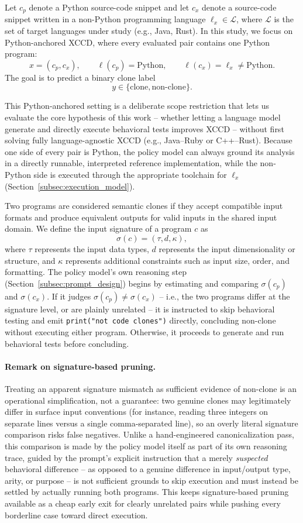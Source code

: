 Let $c_p$ denote a Python source-code snippet and let $c_x$ denote a
source-code snippet written in a non-Python programming language
$\ell_x \in \mathcal{L}$, where $\mathcal{L}$ is the set of target languages
under study (e.g., Java, Rust). In this study, we focus on Python-anchored
XCCD, where every evaluated pair contains one Python program:
\[
    x = (c_p, c_x),
    \qquad
    \ell(c_p)=\text{Python},
    \qquad
    \ell(c_x)=\ell_x \neq \text{Python}.
\]
The goal is to predict a binary clone label
\[
    y \in \{\text{clone}, \text{non-clone}\}.
\]

This Python-anchored setting is a deliberate scope restriction that lets us
evaluate the core hypothesis of this work -- whether letting a language model
generate and directly execute behavioral tests improves XCCD -- without first
solving fully language-agnostic XCCD (e.g., Java--Ruby or C++--Rust). Because
one side of every pair is Python, the policy model can always ground its
analysis in a directly runnable, interpreted reference implementation, while
the non-Python side is executed through the appropriate toolchain for
$\ell_x$ (Section~\ref{subsec:execution_model}).

Two programs are considered semantic clones if they accept compatible input
formats and produce equivalent outputs for valid inputs in the shared input
domain. We define the input signature of a program $c$ as
\[
    \sigma(c) = (\tau, d, \kappa),
\]
where $\tau$ represents the input data types, $d$ represents the input
dimensionality or structure, and $\kappa$ represents additional constraints
such as input size, order, and formatting. The policy model's own reasoning
step (Section~\ref{subsec:prompt_design}) begins by estimating and comparing
$\sigma(c_p)$ and $\sigma(c_x)$. If it judges
$\sigma(c_p) \neq \sigma(c_x)$ -- i.e., the two programs differ at the
signature level, or are plainly unrelated -- it is instructed to skip
behavioral testing and emit \texttt{print("not code clones")} directly,
concluding non-clone without executing either program. Otherwise, it proceeds
to generate and run behavioral tests before concluding.

\paragraph{Remark on signature-based pruning.}
Treating an apparent signature mismatch as sufficient evidence of non-clone is
an operational simplification, not a guarantee: two genuine clones may
legitimately differ in surface input conventions (for instance, reading three
integers on separate lines versus a single comma-separated line), so an overly
literal signature comparison risks false negatives. Unlike a hand-engineered
canonicalization pass, this comparison is made by the policy model itself as
part of its own reasoning trace, guided by the prompt's explicit instruction
that a merely \emph{suspected} behavioral difference -- as opposed to a
genuine difference in input/output type, arity, or purpose -- is not
sufficient grounds to skip execution and must instead be settled by actually
running both programs. This keeps signature-based pruning available as a
cheap early exit for clearly unrelated pairs while pushing every borderline
case toward direct execution.

